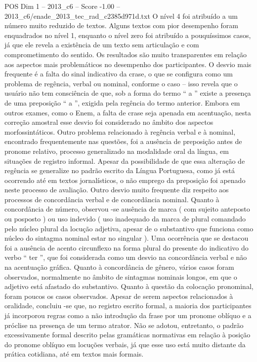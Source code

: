 \begin{textsample}{POS Dim 1 – 2013\_c6 – Score -1.00 – 2013\_c6/enade\_2013\_tec\_rad\_c2385d971d.txt}
O nível 4 foi atribuído a um número muito reduzido de textos.
Alguns textos com pior desempenho foram enquadrados no nível 1, enquanto o nível zero foi atribuído a pouquíssimos casos, já que ele revela a existência de um texto sem articulação e com comprometimento do sentido.
Os resultados são muito transparentes em relação aos aspectos mais problemáticos no desempenho dos participantes.
O desvio mais frequente é a falta do sinal indicativo da crase, o que se configura como um problema de regência, verbal ou nominal, conforme o caso – isso revela que o usuário não tem consciência de que, sob a forma do termo “ a ” existe a presença de uma preposição “ a ”, exigida pela regência do termo anterior.
Embora em outros exames, como o Enem, a falta de crase seja apenada em acentuação, nesta correção amostral esse desvio foi considerado no âmbito dos aspectos morfossintáticos.
Outro problema relacionado à regência verbal e à nominal, encontrado frequentemente nas questões, foi a ausência de preposição antes de pronome relativo, processo generalizado na modalidade oral da língua, em situações de registro informal.
Apesar da possibilidade de que essa alteração de regência se generalize no padrão escrito da Língua Portuguesa, como já está ocorrendo até em textos jornalísticos, o não emprego da preposição foi apenado neste processo de avaliação.
Outro desvio muito frequente diz respeito aos processos de concordância verbal e de concordância nominal.
Quanto à concordância de número, observou -se ausência de marca ( com sujeito anteposto ou posposto ) ou uso indevido ( uso inadequado da marca de plural comandado pelo núcleo plural da locução adjetiva, apesar de o substantivo que funciona como núcleo do sintagma nominal estar no singular ).
Uma ocorrência que se destacou foi a ausência de acento circunflexo na forma plural do presente do indicativo do verbo “ ter ”, que foi considerada como um desvio na concordância verbal e não na acentuação gráfica.
Quanto à concordância de gênero, vários casos foram observados, normalmente no âmbito de sintagmas nominais longos, em que o adjetivo está afastado do substantivo.
Quanto à questão da colocação pronominal, foram poucos os casos observados.
Apesar de serem aspectos relacionados à oralidade, concluiu -se que, no registro escrito formal, a maioria dos participantes já incorporou regras como a não introdução da frase por um pronome oblíquo e a próclise na presença de um termo atrator.
Não se adotou, entretanto, o padrão excessivamente formal descrito pelas gramáticas normativas em relação à posição do pronome oblíquo em locuções verbais, já que esse uso está muito distante da prática cotidiana, até em textos mais formais.

\end{textsample}
